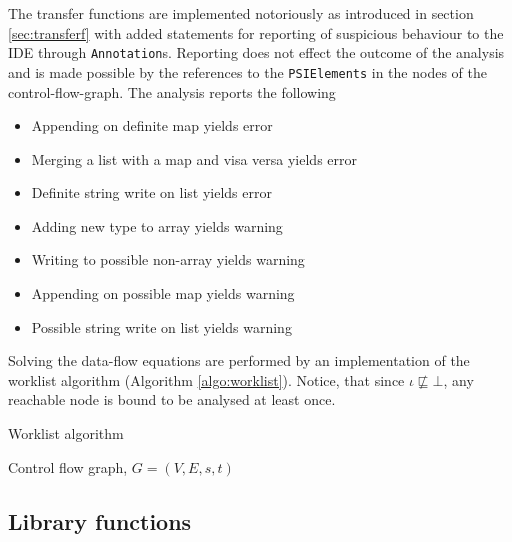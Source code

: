 The transfer functions are implemented notoriously as introduced in section \ref{sec:transferf} with added statements for reporting of suspicious behaviour to the IDE through \texttt{Annotation}s. Reporting does not effect the outcome of the analysis and is made possible by the references to the \texttt{PSIElements} in the nodes of the control-flow-graph. The analysis reports the following
\begin{itemize}
\item Appending on definite map yields error
\item Merging a list with a map and visa versa yields error
\item Definite string write on list yields error
\item Adding new type to array yields warning
\item Writing to possible non-array yields warning
\item Appending on possible map yields warning
\item Possible string write on list yields warning
\end{itemize}
Solving the data-flow equations are performed by an implementation of the worklist algorithm (Algorithm \ref{algo:worklist}). Notice, that since $\iota \not\sqsubseteq \bot$, any reachable node is bound to be analysed at least once. 

\begin{algorithm}
\caption{Worklist algorithm}
\label{algo:worklist}
\begin{algorithmic}[1]
\scriptsize
\Require Control flow graph, $G=(V,E,s,t)$
	
		
		
	\EndIf
	
\EndWhile
\end{algorithmic}
\end{algorithm}

\subsection{Library functions}

